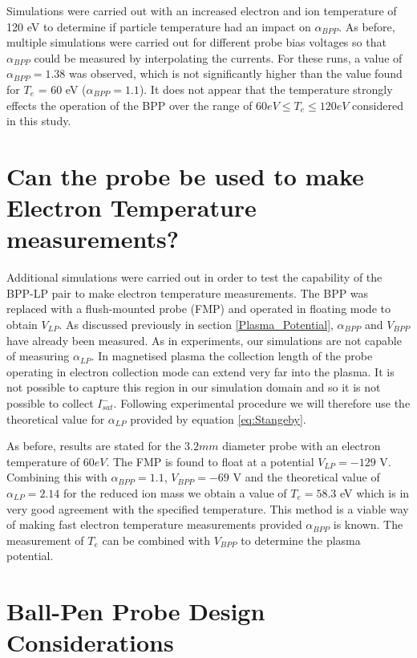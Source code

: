 Simulations were carried out with an increased electron and ion temperature of 120 eV to determine if particle temperature had an impact on $\alpha_{BPP}$. As before, multiple simulations were carried out for different probe bias voltages so that $\alpha_{BPP}$ could be measured by interpolating the currents.  For these runs, a value of $\alpha_{BPP} = 1.38$ was observed, which is not significantly higher than the value found for $T_e$ = 60 eV  ($\alpha_{BPP} =1.1$). It does not appear that the temperature strongly effects the operation of the BPP over the range of $60 eV \leq T_e \leq 120eV$ considered in this study.



\section{Can the probe be used to make Electron Temperature measurements?} \label{section:temperature}
Additional simulations were carried out in order to test the capability of the BPP-LP pair to make electron temperature measurements. The BPP was replaced with a flush-mounted probe (FMP) and operated in floating mode to obtain $V_{LP}$. As discussed previously in section \ref{Plasma_Potential}, $\alpha_{BPP}$ and $V_{BPP}$ have already been measured. As in experiments, our simulations are not capable of measuring $\alpha_{LP}$. In magnetised plasma the collection length of the probe operating in electron collection mode can extend very far into the plasma. It is not possible to capture this region in our simulation domain and so it is not possible to collect $I^-_{sat}$. Following experimental procedure we will therefore use the theoretical value for $\alpha_{LP}$ provided by equation \ref{eq:Stangeby}.

As before, results are stated for the $3.2mm$ diameter probe with an electron temperature of $60eV$. The FMP is found to float at a potential $V_{LP} = -129$ V. Combining this with $\alpha_{BPP}= 1.1$, $V_{BPP} = -69 $ V and the theoretical value of $\alpha_{LP} = 2.14$ for the reduced ion mass we obtain a value of $T_e = 58.3$ eV which is in very good agreement with the specified temperature. This method is a viable way of making fast electron temperature measurements provided $\alpha_{BPP}$ is known. The measurement of $T_e$ can be combined with $V_{BPP}$ to determine the plasma potential.


\section{Ball-Pen Probe Design Considerations} \label{Design}
